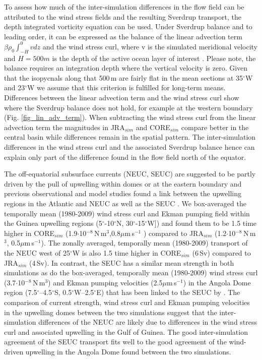 \documentclass[os, manuscript]{copernicus}
\begin{document}
To assess how much of the inter-simulation differences in the flow field can be attributed to the wind stress fields and the resulting Sverdrup transport, the depth integrated vorticity equation can be used. Under Sverdrup balance and to leading order, it can be expressed as the balance of the linear advection term $\beta \rho_0 \int_{-H}^{0} v dz$ and the wind stress curl, where v is the simulated meridional velocity and $H=500m$ is the depth of the active ocean layer of interest \citep{Small2015}. Please note, the balance requires an integration depth where the vertical velocity is zero. Given that the isopycnals along that 500$\,$m are fairly flat in the mean sections at 35$^{\circ}$W and 23$^{\circ}$W we assume that this criterion is fulfilled for long-term means. Differences between the linear advection term and the wind stress curl show where the Sverdrup balance does not hold, for example at the western boundary (Fig. \ref{fig_lin_adv_term}). When subtracting the wind stress curl from the linear advection term the magnitudes in JRA$_{sim}$ and CORE$_{sim}$ compare better in the central basin while differences remain in the spatial pattern. The inter-simulation differences in the wind stress curl and the associated Sverdrup balance hence can explain only part of the difference found in the flow field north of the equator.

The off-equatorial subsurface currents (NEUC, SEUC) are suggested to be partly driven by the pull of upwelling within domes or at the eastern boundary \citep{Furue2007,Furue2009,McCreary2002a} and previous observational and model studies found a link between the upwelling regions in the Atlantic and NEUC \citep{Stramma2005,Huettl2008,Goes2013} as well as the SEUC \citep{Doi2007}. We box-averaged the temporally mean (1980-2009) wind stress curl and Ekman pumping field within the Guinea upwelling regions (5$^{\circ}$-10$^{\circ}$N, 30$^{\circ}$-15$^{\circ}$W]) and found them to be 1.5 time higher in CORE$_{sim}$ (1.9$\cdot$10$^{-8}\,$N$\,$m$^3$,0.8$\mu$m$\,$s$ ^{-1} $ ) compared to JRA$_{sim}$ (1.2$\cdot$10$^{-8}\,$N$\,$m$^3$, 0.5$\mu$m$\,$s$ ^{-1} $). The zonally averaged, temporally mean (1980-2009) transport of the NEUC west of 25$^{\circ}$W is also 1.5 time higher in CORE$_{sim}$ (6$\,$Sv) compared to JRA$_{sim}$ (4$\,$Sv). In contrast, the SEUC has a similar mean strength in both simulations as do the box-averaged, temporally mean (1980-2009) wind stress curl (3.7$\cdot$10$^{-8}\,$N$\,$m$^3$) and Ekman pumping velocities (2.5$\mu$m$\,$s$ ^{-1} $) in the Angola Dome region (7.5$^{\circ}$–4.5$^{\circ}$S, 0.5$^{\circ}$W–2.5$^{\circ}$E) that has been linked to the SEUC by \cite{Doi2007}. The comparison of current strength, wind stress curl and Ekman pumping velocities in the upwelling domes between the two simulations suggest that the inter-simulation differences of the NEUC are likely due to differences in the wind stress curl and associated upwelling in the Gulf of Guinea. The good inter-simulation agreement of the SEUC transport fits well to the good agreement of the wind-driven upwelling in the Angola Dome found between the two simulations. 
\end{document}
